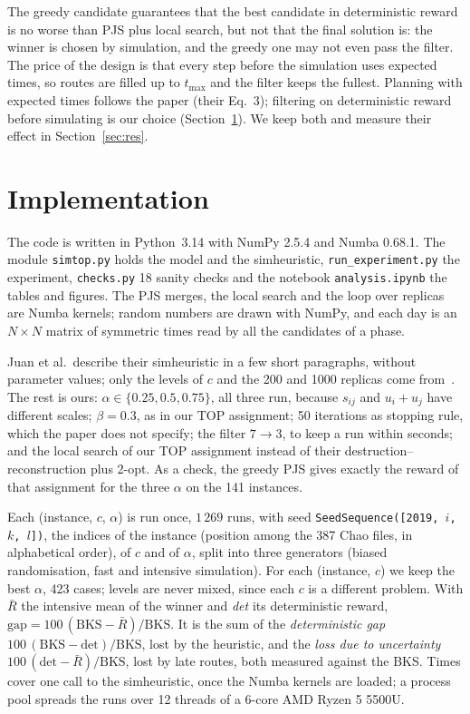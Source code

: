 \documentclass[10pt,a4paper]{article}
\begin{document}
The greedy candidate guarantees that the best candidate in deterministic reward is no worse than PJS
plus local search, but not that the final solution is: the winner is chosen by simulation, and the
greedy one may not even pass the filter. The price of the design is that every step before the
simulation uses expected times, so routes are filled up to $t_{\max}$ and the filter keeps the fullest.
Planning with expected times follows the paper (their Eq.~3); filtering on deterministic reward before
simulating is our choice (Section~\ref{sec:impl}). We keep both and measure their effect in
Section~\ref{sec:res}.

\section{Implementation}
\label{sec:impl}

The code is written in Python~3.14 with NumPy 2.5.4 and Numba 0.68.1. The module \texttt{simtop.py}
holds the model and the simheuristic, \texttt{run\_experiment.py} the experiment, \texttt{checks.py} 18
sanity checks and the notebook \texttt{analysis.ipynb} the tables and figures. The PJS merges, the local search and the loop over replicas are Numba kernels; random
numbers are drawn with NumPy, and each day is an $N\times N$ matrix of symmetric times read by all the
candidates of a phase.

Juan et al.\ describe their simheuristic in a few short paragraphs, without parameter values; only the levels of
$c$ and the 200 and 1000 replicas come from~\cite{juan2019}. The rest is ours: $\alpha\in\{0.25,0.5,0.75\}$,
all three run, because $s_{ij}$ and $u_i+u_j$ have different scales; $\beta=0.3$, as in our TOP
assignment; 50 iterations as stopping rule, which the paper does not specify; the filter $7\to3$, to keep a run
within seconds; and the local search of our TOP assignment instead of their destruction--reconstruction
plus 2-opt. As a check, the greedy PJS gives exactly the reward of that assignment for the three
$\alpha$ on the 141 instances.

Each (instance, $c$, $\alpha$) is run once, $1\,269$ runs, with seed
\texttt{SeedSequence([2019, $i$, $k$, $l$])}, the indices of the instance (position among the 387 Chao files, in alphabetical order), of $c$
and of $\alpha$, split into three generators (biased randomisation,
fast and intensive simulation). For each (instance, $c$) we keep the best $\alpha$, 423 cases; levels are
never mixed, since each $c$ is a different problem. With $\bar R$ the intensive mean of the winner and
\emph{det} its deterministic reward, $\text{gap}=100\,(\text{BKS}-\bar R)/\text{BKS}$. It is the sum of the \emph{deterministic gap}
$100\,(\text{BKS}-\text{det})/\text{BKS}$, lost by the heuristic, and the \emph{loss due to uncertainty}
$100\,(\text{det}-\bar R)/\text{BKS}$, lost by late routes, both measured against the BKS. Times cover one call to the simheuristic, once the Numba
kernels are loaded; a process pool spreads the runs over 12 threads of a 6-core AMD Ryzen 5 5500U.
\end{document}
